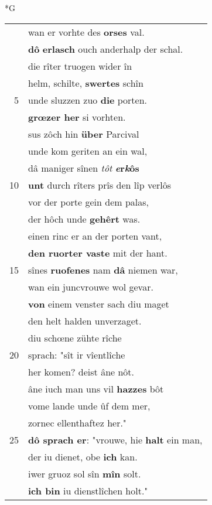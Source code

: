 \documentclass[8pt,a4paper,notitlepage]{article}
\begin{document}
\newpage
\begin{table}[ht]
\begin{minipage}[t]{0.5\linewidth}
\small
\begin{center}*G
\end{center}
\begin{tabular}{rl}
 & wan er vorhte des \textbf{orses} val.\\ 
 & \textbf{dô} \textbf{erlasch} ouch anderhalp der schal.\\ 
 & die rîter truogen wider în\\ 
 & helm, schilte, \textbf{swertes} schîn\\ 
5 & unde sluzzen zuo \textbf{die} porten.\\ 
 & \textbf{grœzer her} si vorhten.\\ 
 & sus zôch hin \textbf{über} Parcival\\ 
 & unde kom geriten an ein wal,\\ 
 & dâ maniger sînen \textit{tôt} \textbf{\textit{e}r\textit{k}ôs}\\ 
10 & \textbf{unt} durch rîters prîs den lîp verlôs\\ 
 & vor der porte gein dem palas,\\ 
 & der hôch unde \textbf{gehêrt} was.\\ 
 & einen rinc er an der porten vant,\\ 
 & \textbf{den ruorter vaste} mit der hant.\\ 
15 & sînes \textbf{ruofenes} nam \textbf{dâ} niemen war,\\ 
 & wan ein juncvrouwe wol gevar.\\ 
 & \textbf{von} einem venster sach diu maget\\ 
 & den helt halden unverzaget.\\ 
 & diu schœne zühte rîche\\ 
20 & sprach: "sît ir vîentlîche\\ 
 & her komen? deist âne nôt.\\ 
 & âne iuch man uns vil \textbf{hazzes} bôt\\ 
 & vome lande unde ûf dem mer,\\ 
 & zornec ellenthaftez her."\\ 
25 & \textbf{dô sprach er}: "vrouwe, hie \textbf{halt} ein man,\\ 
 & der iu dienet, obe \textbf{ich} kan.\\ 
 & iwer gruoz sol sîn \textbf{mîn} solt.\\ 
 & \textbf{ich bin} iu dienstlîchen holt."\\ 

\end{tabular}
\end{minipage}
\end{table}
\end{document}
